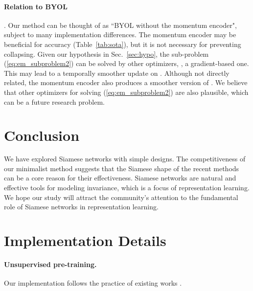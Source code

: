 \documentclass[final]{cvpr}
\begin{document}
\paragraph{Relation to BYOL} \cite{Grill2020}. Our method can be thought of as ``BYOL without the momentum encoder", subject to many implementation differences. The momentum encoder may be beneficial for accuracy (Table~\ref{tab:sota}), but it is not necessary for preventing collapsing.
Given our hypothesis in Sec.~\ref{sec:hypo}, the  sub-problem (\ref{eq:em_subproblem2}) can be solved by other optimizers, \eg, a gradient-based one. This may lead to a temporally smoother update on . 
Although not directly related, the momentum encoder also produces a smoother version of . We believe that other optimizers for solving (\ref{eq:em_subproblem2}) are also plausible, which can be a future research problem.

\section{Conclusion\label{sec:conc}}

We have explored Siamese networks with simple designs. The competitiveness of our minimalist method suggests that the Siamese shape of the recent methods can be a core reason for their effectiveness. Siamese networks are natural and effective tools for modeling invariance, which is a focus of representation learning. We hope our study will attract the community's attention to the fundamental role of Siamese networks in representation learning.

{\small
{}
\renewcommand\UrlFont{\color{Gray}\rmfamily}


}

\newpage

\renewcommand\thefigure{\thesection.\arabic{figure}}
\renewcommand\thetable{\thesection.\arabic{table}}
\setcounter{figure}{0} 
\setcounter{table}{0} 

\appendix

\section{Implementation Details}

\paragraph{Unsupervised pre-training.} Our implementation follows the practice of existing works \cite{Wu2018a,He2019a,Chen2020,Chen2020a,Grill2020}.
\end{document}

